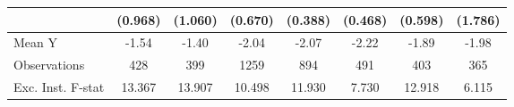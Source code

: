 {\begin{tabular}{l*{7}{c}}
            &     (0.968)         &     (1.060)         &     (0.670)         &     (0.388)         &     (0.468)         &     (0.598)         &     (1.786)         \\
\midrule
Mean Y      &       -1.54         &       -1.40         &       -2.04         &       -2.07         &       -2.22         &       -1.89         &       -1.98         \\
Observations&         428         &         399         &        1259         &         894         &         491         &         403         &         365         \\
Exc. Inst. F-stat&      13.367         &      13.907         &      10.498         &      11.930         &       7.730         &      12.918         &       6.115         \\
\bottomrule
\end{tabular}
}
